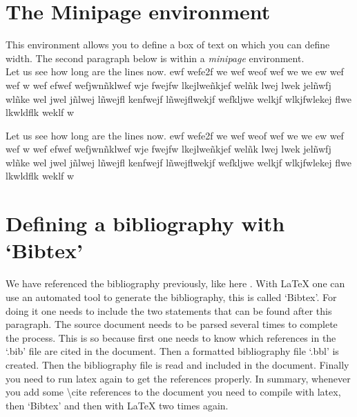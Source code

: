 \documentclass[a4paper]{article}
\newcommand{\bs}[1]{{\color{blue}\textbackslash{}#1}}
\begin{document}
\section{The Minipage environment}

This environment allows you to define a box of text on which you can define width. The second paragraph below is within a \emph{minipage} environment.\\

Let us see how long are the lines now. ewf wefe2f we wef weof wef we we ew wef wef w wef efwef wefjwnñklwef wje fwejfw lkejlweñkjef welñk lwej lwek jelñwfj wlñke wel jwel jñlwej lñwejfl kenfwejf lñwejflwekjf wefkljwe welkjf wlkjfwlekej flwe lkwldflk weklf w\\ 

\begin{minipage}[b]{.5\textwidth}
Let us see how long are the lines now. ewf wefe2f we wef weof wef we we ew wef wef w wef efwef wefjwnñklwef wje fwejfw lkejlweñkjef welñk lwej lwek jelñwfj wlñke wel jwel jñlwej lñwejfl kenfwejf lñwejflwekjf wefkljwe welkjf wlkjfwlekej flwe lkwldflk weklf w 
\end{minipage}


\section{Defining a bibliography with `Bibtex'}

We have referenced the bibliography previously, like here \cite{Stone1932}. With \LaTeX{} one can use an automated tool to generate the bibliography, this is called `Bibtex'.  For doing it one needs to include the two statements that can be found after this paragraph. The source document needs to be parsed several times to complete the process. This is so because first one needs to know which references in the `.bib' file are cited in the document. Then a formatted bibliography file `.bbl' is created. Then the bibliography file is read and included in the document. Finally you need to run latex again to get the references properly. In summary, whenever you add some \bs{cite} references to the document you need to compile with latex, then `Bibtex' and then with \LaTeX{} two times again. 




\end{document}
